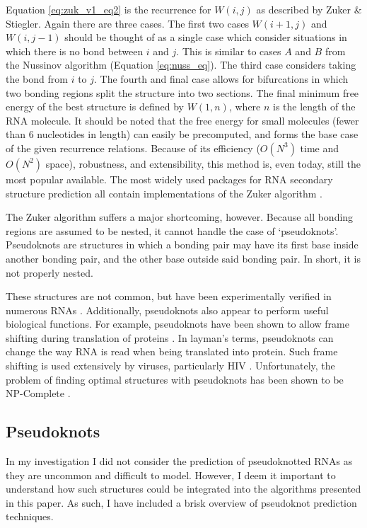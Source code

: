 \documentclass{cshonours}
\begin{document}
Equation \ref{eq:zuk_v1_eq2} is the recurrence for $W(i, j)$ as described by Zuker \& Stiegler.
Again there are three cases. The first two cases $W (i + 1, j)$ and $W(i, j - 1)$
should be thought of as a single case which consider situations in which there
is no bond between $i$ and $j$. This is similar to cases $A$ and $B$ from the Nussinov algorithm (Equation \ref{eq:nuss_eq}). The third case considers taking the bond from
$i$ to $j$. The fourth and final case allows for bifurcations in which two bonding regions split
the structure into two sections. The final minimum free energy of the best structure is defined by $W(1, n)$, where $n$ is the length of the RNA molecule. It should
be noted that the free energy for small molecules (fewer than 6 nucleotides in length) can easily be
precomputed, and forms the base case of the given recurrence relations. Because of
its efficiency ($O(N^3)$ time and $O(N^2)$ space), robustness, and extensibility, this method is,
even today, still the most popular available. The most widely used packages for RNA secondary structure prediction all contain implementations of the Zuker algorithm \cite{lorenz2011viennarna, reuter2010rnastructure}.


The Zuker algorithm suffers a major shortcoming, however. Because all bonding regions are assumed to be nested, it
cannot handle the case of `pseudoknots'. Pseudoknots are structures in which a bonding pair may have its first
base inside another bonding pair, and the other base outside said bonding pair.
In short, it is not properly nested. 

These structures are not common,
but have been experimentally verified in numerous RNAs \cite{taufer2009pseudobase}. Additionally, pseudoknots also appear to perform useful biological functions. For
example, pseudoknots have been shown to allow frame shifting during translation
of proteins \cite{namy2006mechanical}. In layman’s terms, pseudoknots can change the way RNA is read
when being translated into protein. Such frame shifting is used extensively by
viruses, particularly HIV \cite{namy2006mechanical}. Unfortunately, the problem of finding optimal
structures with pseudoknots has been shown to be NP-Complete \cite{lyngso2000rna}.



\subsection{Pseudoknots}
In my investigation I did not consider the prediction of pseudoknotted RNAs as they are uncommon and difficult to model. However, I deem it important to understand how such structures could be integrated into the algorithms presented in this paper. As such, I have included a brisk overview of pseudoknot prediction techniques.
\end{document}
